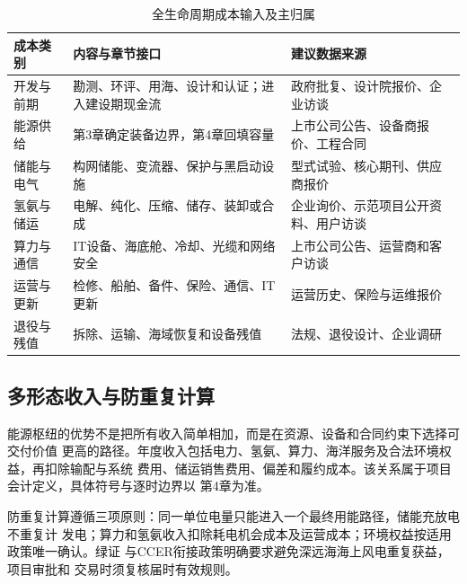 \begin{table}[H]
\centering
\caption{全生命周期成本输入及主归属}
\label{tab:c6-cost-boundary}
\small
\begin{tabularx}{\textwidth}{p{2.3cm} X X}
\toprule
成本类别 & 内容与章节接口 & 建议数据来源\\
\midrule
开发与前期 & 勘测、环评、用海、设计和认证；进入建设期现金流 & 政府批复、设计院报价、企业访谈\\
能源供给 & 第3章确定装备边界，第4章回填容量 & 上市公司公告、设备商报价、工程合同\\
储能与电气 & 构网储能、变流器、保护与黑启动设施 & 型式试验、核心期刊、供应商报价\\
氢氨与储运 & 电解、纯化、压缩、储存、装卸或合成 & 企业询价、示范项目公开资料、用户访谈\\
算力与通信 & IT设备、海底舱、冷却、光缆和网络安全 & 上市公司公告、运营商和客户访谈\\
运营与更新 & 检修、船舶、备件、保险、通信、IT更新 & 运营历史、保险与运维报价\\
退役与残值 & 拆除、运输、海域恢复和设备残值 & 法规、退役设计、企业调研\\
\bottomrule
\end{tabularx}
\end{table}

\subsection{多形态收入与防重复计算}

能源枢纽的优势不是把所有收入简单相加，而是在资源、设备和合同约束下选择可交付价值
更高的路径。年度收入包括电力、氢氨、算力、海洋服务及合法环境权益，再扣除输配与系统
费用、储运销售费用、偏差和履约成本。该关系属于项目会计定义，具体符号与逐时边界以
第4章为准。

防重复计算遵循三项原则：同一单位电量只能进入一个最终用能路径，储能充放电不重复计
发电；算力和氢氨收入扣除耗电机会成本及运营成本；环境权益按适用政策唯一确认。绿证
与CCER衔接政策明确要求避免深远海海上风电重复获益\cite{green-cert-ccer}，项目审批和
交易时须复核届时有效规则。


